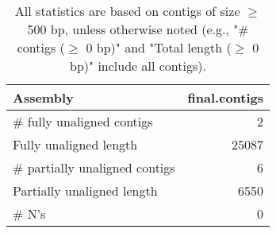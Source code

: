 \documentclass[12pt,a4paper]{article}
\begin{document}
\begin{table}[ht]
\begin{center}
\caption{All statistics are based on contigs of size $\geq$ 500 bp, unless otherwise noted (e.g., "\# contigs ($\geq$ 0 bp)" and "Total length ($\geq$ 0 bp)" include all contigs).}
\begin{tabular}{|l*{1}{|r}|}
\hline
Assembly & final.contigs \\ \hline
\# fully unaligned contigs & 2 \\ \hline
Fully unaligned length & 25087 \\ \hline
\# partially unaligned contigs & 6 \\ \hline
Partially unaligned length & 6550 \\ \hline
\# N's & 0 \\ \hline
\end{tabular}
\end{center}
\end{table}
\end{document}
